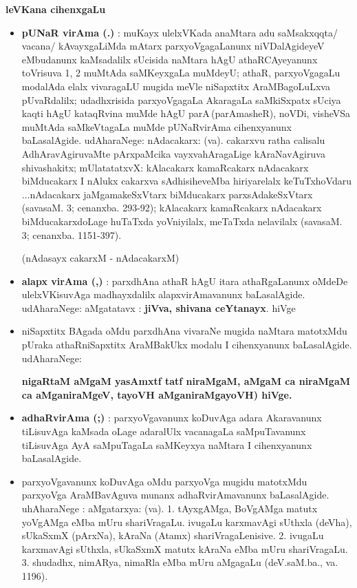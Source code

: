 \begin{center}
{\large\bf leVKana cihenxgaLu}
\bigskip
\end{center}
\begin{itemize}
\item {\bf pUNaR virAma (.)} : muKayx ulelxVKada anaMtara adu saMsakxqqta/ vacana/ kAvayxgaLiMda mAtarx parxyoVgagaLanunx niVDa\-lAgideyeV eMbudanunx kaMsa\-dalilx sUcisida naMtara hAgU athaRCAyeyanunx toVrisuva 1, 2 muMtAda saMKeyxgaLa muMdeyU; athaR, parxyoVga\-gaLu modalAda elalx vivaragaLU mugida meVle niSapxtitx AraMBagoLuLxva pUvaRdalilx; udadhxrisida  parxyoVgagaLa AkaragaLa saMkiSxpatx sUciya kaqti hAgU kataqRvina muMde hAgU parA\,(parAmasheR), noVDi, visheVSa muMtAda saMkeVtagaLa muMde pUNaRvirAma cihenxyanunx baLasalAgide. udAharaNege: nAdacakarx: (va). cakarxvu ratha calisalu AdhAravAgiruvaMte pArxpaMcika vayxvahAragaLige kAraNavAgiruva shivashakitx; mUla\-tatatxvX: kAlacakarx kamaRcakarx nAdacakarx biMducakarx I nAlukx cakarxva sAdhisiheveMba hiriyarelalx keTuTxhoVdaru ...nAdacakarx jaMgama\-keSxVtarx biMducakarx parxsAdakeSxVtarx (savasaM. 3; cenanxba. 293-92); kAlacakarx kamaRcakarx nAdacakarx biMducakarxdoLage huTaTxda yoVni\-yilalx, meTaTxda nela\-vilalx (savasaM. 3; cenanxba. 1151-397).

\noindent
(nAdasayx cakarxM - nAdacakarxM)

\item {\bf alapx virAma (,)} : parxdhAna athaR hAgU itara athaRgaLanunx oMdeDe ulelxVKisuvAga madhayxdalilx alapxvirAmavanunx baLasalAgide. udAharaNege: aMgatatavx : \textbf{jiVva, shivana ceYtanayx}. hiVge

\item niSapxtitx BAgada oMdu parxdhAna vivaraNe mugida naMtara matotxMdu pUraka athaRniSapxtitx AraMBakUkx modalu I cihenx\-yanunx baLasalAgide. udAharaNege: 

\textbf{nigaRtaM aMgaM yasAmxtf tatf niraMgaM, aMgaM ca niraMgaM ca aMganiraMgeV, tayoVH aMganiraMgayoVH) hiVge.}


\item {\bf adhaRvirAma (;)} : parxyoVgavanunx koDuvAga adara Akaravanunx tiLisuvAga kaMsada oLage adaralUlx vacanagaLa saMpuTavanunx tiLisuvAga AyA saMpuTagaLa saMKeyxya naMtara I cihenxyanunx baLasalAgide.

\item  parxyoVgavanunx koDuvAga oMdu parxyoVga mugidu matotxMdu parxyoVga AraMBavAguva munanx  adhaRvirAmavanunx baLasalAgide. uhAharaNege : aMgatarxya: (va). 1. tAyxgAMga, BoVgAMga matutx yoVgAMga eMba mUru shariVragaLu. ivugaLu karxmavAgi sUthxla (deVha), sUkaSxmX (pArxNa), kAraNa (Atamx) shariVragaLenisive. 2. ivugaLu karxmavAgi sUthxla, sUkaSxmX matutx kAraNa eMba mUru shariVragaLu. 3. shudadhx, nimARya, nimaRla eMba mUru aMgagaLu (deV.saM.ba., va. 1196).


\end{itemize}
